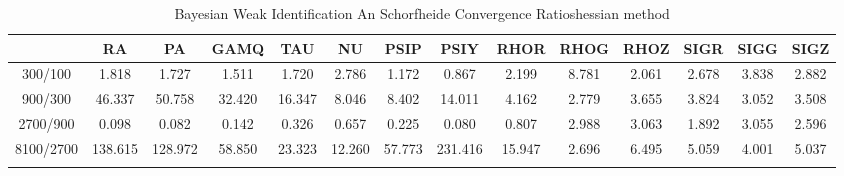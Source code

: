 \documentclass[a4paper,10pt]{article}
\begin{document}
\centering
\begin{longtable}{cccccccccccccc}
\toprule
 & RA & PA & GAMQ & TAU & NU & PSIP & PSIY & RHOR & RHOG & RHOZ & SIGR & SIGG & SIGZ \\
\midrule
300/100 & 1.818 & 1.727 & 1.511 & 1.720 & 2.786 & 1.172 & 0.867 & 2.199 & 8.781 & 2.061 & 2.678 & 3.838 & 2.882 \\
900/300 & 46.337 & 50.758 & 32.420 & 16.347 & 8.046 & 8.402 & 14.011 & 4.162 & 2.779 & 3.655 & 3.824 & 3.052 & 3.508 \\
2700/900 & 0.098 & 0.082 & 0.142 & 0.326 & 0.657 & 0.225 & 0.080 & 0.807 & 2.988 & 3.063 & 1.892 & 3.055 & 2.596 \\
8100/2700 & 138.615 & 128.972 & 58.850 & 23.323 & 12.260 & 57.773 & 231.416 & 15.947 & 2.696 & 6.495 & 5.059 & 4.001 & 5.037 \\
\bottomrule
\caption{Bayesian Weak Identification An Schorfheide Convergence Ratioshessian method}
\label{table:tbl:WeakAnSchoConvergenceRatios_hessian}
\end{longtable}
\end{document}
